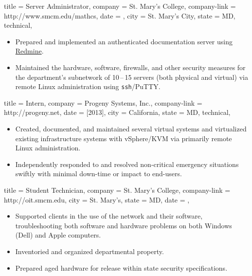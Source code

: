 \documentclass{simplecv}
\begin{document}
\begin{position}
  {
    title   = Server Administrator,
    company = St. Mary's College,
    company-link = http://www.smcm.edu/mathcs,
    date    = ,
    city    = St. Mary's City,
    state   = MD,
    technical,
  }

\begin{itemize}
\item Prepared and implemented an authenticated documentation server using \href{http://www.redmine.org}{Redmine}.
\item Maintained the hardware, software, firewalls, and other security measures
  for the department's subnetwork of 10\,--\,15 servers (both physical and virtual) via remote Linux administration using \texttt{ssh}\slash PuTTY.
\end{itemize}
\end{position}

\begin{position}
  {
    title   = Intern,
    company = {Progeny Systems, Inc.},
    company-link = http://progeny.net,
    date    = [2013],
    city    = California,
    state   = MD,
    technical,
  }

\begin{itemize}
\item Created, documented, and maintained several virtual systems
  and virtualized existing infrastructure systems with vSphere\slash KVM via primarily remote Linux administration.
\item Independently responded to and resolved non-critical emergency situations swiftly
  with minimal down-time or impact to end-users.
\end{itemize}
\end{position}

\begin{position}
  {
    title   = Student Technician,
    company = St. Mary's College,%
    company-link = http://oit.smcm.edu,
    city    = St. Mary's,
    state   = MD,
    date    = ,
  }

\begin{itemize}
\item Supported clients in the use of the network and their software,
  troubleshooting both software and hardware problems on both Windows (Dell) and Apple computers.
\item Inventoried and organized departmental property.
\item Prepared aged hardware for release within state security specifications.
\end{itemize}
\end{position}
\end{document}
